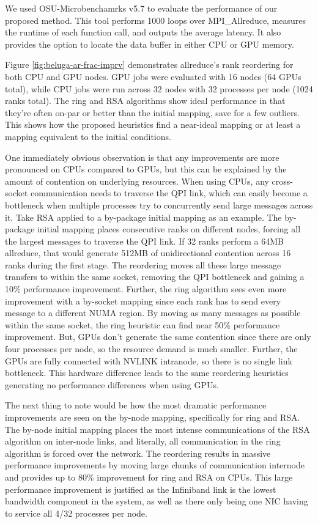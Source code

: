 We used OSU-Microbenchamrks v5.7 \cite{Bureddy2012OMB} to evaluate the performance of our proposed method. 
This tool performs 1000 loops over MPI\_Allreduce, measures the runtime of each function call, and outputs the average latency. 
It also provides the option to locate the data buffer in either CPU or GPU memory.

Figure \ref{fig:beluga-ar-frac-imprv} demonstrates allreduce's rank reordering for both CPU and GPU nodes.
GPU jobs were evaluated with 16 nodes (64 GPUs total), while CPU jobs were run across 32 nodes with 32 processes per node (1024 ranks total).
The ring and RSA algorithms show ideal performance in that they're often on-par or better than the initial mapping, save for a few outliers.
This shows how the proposed heuristics find a near-ideal mapping or at least a mapping equivalent to the initial conditions.

One immediately obvious observation is that any improvements are more pronounced on CPUs compared to GPUs, but this can be explained by the amount of contention on underlying resources.
When using CPUs, any cross-socket communication needs to traverse the QPI link, which can easily become a bottleneck when multiple processes try to concurrently send large messages across it.
Take RSA applied to a by-package initial mapping as an example.
The by-package initial mapping places consecutive ranks on different nodes, forcing all the largest messages to traverse the QPI link. 
If 32 ranks perform a 64MB allreduce, that would generate 512MB of unidirectional contention across 16 ranks during the first stage.
The reordering moves all these large message transfers to within the same socket, removing the QPI bottleneck and gaining a 10\% performance improvement.   
Further, the ring algorithm sees even more improvement with a by-socket mapping since each rank has to send every message to a different NUMA region.
By moving as many messages as possible within the same socket, the ring heuristic can find near 50\% performance improvement.
But, GPUs don't generate the same contention since there are only four processes per node, so the resource demand is much smaller.
Further, the GPUs are fully connected with NVLINK intranode, so there is no single link bottleneck.
This hardware difference leads to the same reordering heuristics generating no performance differences when using GPUs.

The next thing to note would be how the most dramatic performance improvements are seen on the by-node mapping, specifically for ring and RSA. 
The by-node initial mapping places the most intense communications of the RSA algorithm on inter-node links, and literally, all communication in the ring algorithm is forced over the network.
The reordering results in massive performance improvements by moving large chunks of communication internode and provides up to 80\% improvement for ring and RSA on CPUs.
This large performance improvement is justified as the Infiniband link is the lowest bandwidth component in the system, as well as there only being one NIC having to service all 4/32 processes per node.


